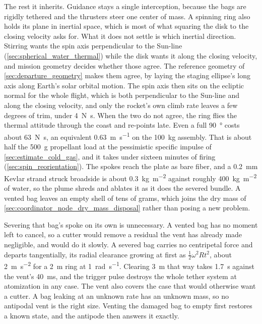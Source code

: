\documentclass{article}
\begin{document}
The rest it inherits. Guidance stays a single interception, because the bags are rigidly tethered and the thrusters steer one center of mass. A spinning ring also holds its plane in inertial space, which is most of what squaring the disk to the closing velocity asks for. What it does not settle is which inertial direction. Stirring wants the spin axis perpendicular to the Sun-line (\autoref{sec:spherical_water_thermal}) while the disk wants it along the closing velocity, and mission geometry decides whether those agree. The reference geometry of \autoref{sec:departure_geometry} makes them agree, by laying the staging ellipse's long axis along Earth's solar orbital motion. The spin axis then sits on the ecliptic normal for the whole flight, which is both perpendicular to the Sun-line and along the closing velocity, and only the rocket's own climb rate leaves a few degrees of trim, under \SI{4}{\newton\second}. When the two do not agree, the ring flies the thermal attitude through the coast and re-points late. Even a full \SI{90}{\degree} costs about \SI{63}{\newton\second}, an equivalent \SI{0.63}{\meter\per\second} on the \SI{100}{\kilo\gram} assembly. That is about half the \SI{500}{\gram} propellant load at the pessimistic specific impulse of \autoref{sec:estimate_cold_gas}, and it takes under sixteen minutes of firing (\autoref{sec:spin_reorientation}). The spokes reach the plate as bare fiber, and a \SI{0.2}{\milli\meter} Kevlar strand struck broadside is about \SI{0.3}{\kilo\gram\per\square\meter} against roughly \SI{400}{\kilo\gram\per\square\meter} of water, so the plume shreds and ablates it as it does the severed bundle. A vented bag leaves an empty shell of tens of grams, which joins the dry mass of \autoref{sec:coordinator_node_dry_mass_disposal} rather than posing a new problem.

Severing that bag's spoke on its own is unnecessary. A vented bag has no moment left to cancel, so a cutter would remove a residual the vent has already made negligible, and would do it slowly. A severed bag carries no centripetal force and departs tangentially, its radial clearance growing at first as $\tfrac{1}{2}\omega^{2}Rt^{2}$, about \SI{2}{\meter\per\second\squared} for a \SI{2}{\meter} ring at \SI{1}{\radian\per\second}. Clearing \SI{3}{\meter} that way takes \SI{1.7}{\second} against the vent's \SI{40}{\milli\second}, and the trigger pulse destroys the whole tether system at atomization in any case. The vent also covers the case that would otherwise want a cutter. A bag leaking at an unknown rate has an unknown mass, so no antipodal vent is the right size. Venting the damaged bag to empty first restores a known state, and the antipode then answers it exactly.
\end{document}
